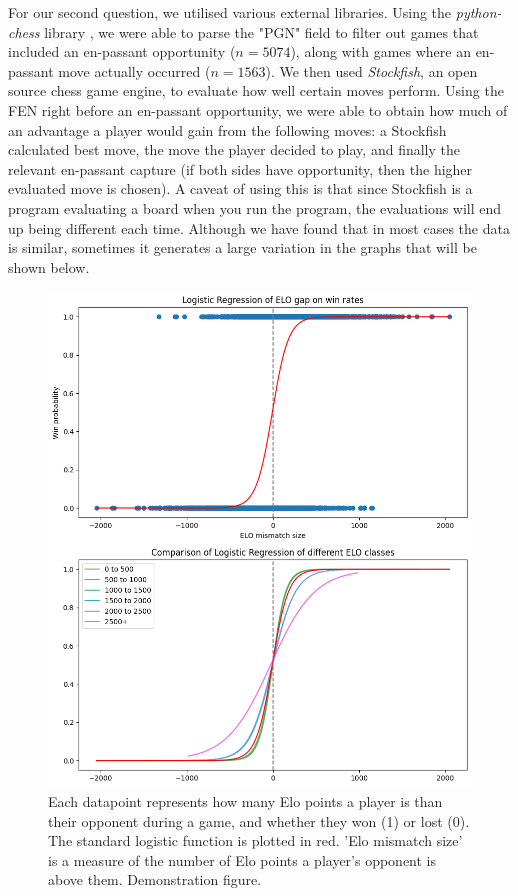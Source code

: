 \documentclass[10pt,a4paper]{article}
\begin{document}
\begin{multicols}{2}
For our second question, we utilised various external libraries. Using the \textit{python-chess} library \cite{python-chess}, we were able to parse the "PGN" field to filter out games that included an en-passant opportunity ($n=5074$), along with games where an en-passant move actually occurred ($n=1563$). We then used \textit{Stockfish}\cite{StockFish}, an open source chess game engine, to evaluate how well certain moves perform. Using the FEN right before an en-passant opportunity, we were able to obtain how much of an advantage a player would gain from the following moves: a Stockfish calculated best move, the move the player decided to play, and finally the relevant en-passant capture (if both sides have opportunity, then the higher evaluated move is chosen). A caveat of using this is that since Stockfish is a program evaluating a board when you run the program, the evaluations will end up being different each time. Although we have found that in most cases the data is similar, sometimes it generates a large variation in the graphs that will be shown below. \newline
\begin{figure}[p]
  \centering
  \includegraphics[width=\textwidth]{report/images/log_regression_dual.png}
  \caption{Each datapoint represents how many Elo points a player is than their opponent during a game, and whether they won (1) or lost (0). The standard logistic function is plotted in red. 'Elo mismatch size' is a measure of the number of Elo points a player's opponent is above them.
  Demonstration figure.}
  \label{fds-project-template:fig:log_regression}
\end{figure}



\end{multicols}
\end{document}
